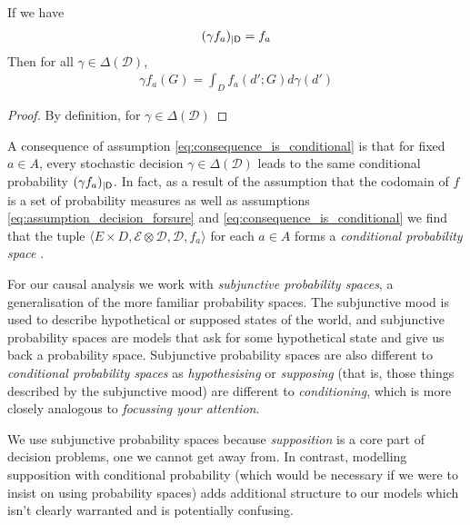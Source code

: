 \begin{lemma}
If we have 
\begin{align}
(\gamma f_{a})_{|\mathsf{D}} = f_a
\end{align}
Then for all $\gamma\in \Delta(\mathcal{D})$,
\begin{align}
\gamma f_a (G) = \int_D f_a(d';G) d\gamma(d')
\end{align}
\end{lemma}

\begin{proof}
By definition, for $\gamma\in \Delta(\mathcal{D})$
\end{proof}

A consequence of assumption \ref{eq:consequence_is_conditional} is that for fixed $a\in A$, every stochastic decision $\gamma\in \Delta(\mathcal{D})$ leads to the same conditional probability $(\gamma f_{a})_{|\mathsf{D}}$. In fact, as a result of the assumption that the codomain of $f$ is a set of probability measures as well as assumptions \ref{eq:assumption_decision_forsure} and \ref{eq:consequence_is_conditional} we find that the tuple $\langle E\times D, \mathcal{E}\otimes\mathcal{D}, \mathcal{D}, f_a\rangle$ for each $a\in A$ forms a \emph{conditional probability space} \citep{renyi_new_1955}.



For our causal analysis we work with \emph{subjunctive probability spaces}, a generalisation of the more familiar probability spaces. The subjunctive mood is used to describe hypothetical or supposed states of the world, and subjunctive probability spaces are models that ask for some hypothetical state and give us back a probability space. Subjunctive probability spaces are also different to \emph{conditional probability spaces} \citet{renyi_conditional_1956} as \emph{hypothesising} or \emph{supposing} (that is, those things described by the subjunctive mood) are different to \emph{conditioning}, which is more closely analogous to \emph{focussing your attention}.

We use subjunctive probability spaces because \emph{supposition} is a core part of decision problems, one we cannot get away from. In contrast, modelling supposition with conditional probability (which would be necessary if we were to insist on using probability spaces) adds additional structure to our models which isn't clearly warranted and is potentially confusing.

